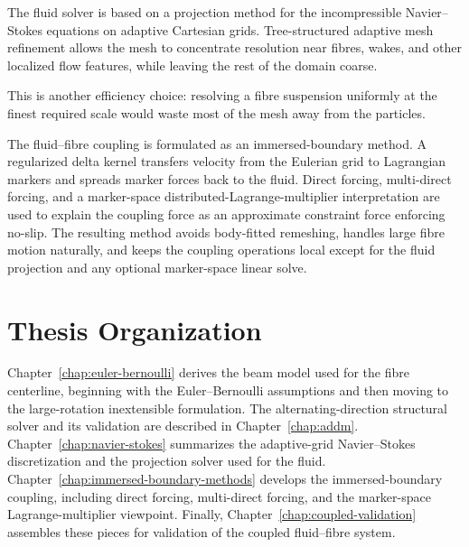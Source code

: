 The fluid solver is based on a projection method for the incompressible
Navier--Stokes equations on adaptive Cartesian grids. Tree-structured adaptive
mesh refinement allows the mesh to concentrate resolution near fibres, wakes,
and other localized flow features, while leaving the rest of the domain coarse.

This is another efficiency choice: resolving a fibre suspension uniformly at
the finest required scale would waste most of the mesh away from the particles.

The fluid--fibre coupling is formulated as an immersed-boundary method. A
regularized delta kernel transfers velocity from the Eulerian grid to
Lagrangian markers and spreads marker forces back to the fluid. Direct forcing,
multi-direct forcing, and a marker-space distributed-Lagrange-multiplier
interpretation are used to explain the coupling force as an approximate
constraint force enforcing no-slip. The resulting method avoids body-fitted
remeshing, handles large fibre motion naturally, and keeps the coupling
operations local except for the fluid projection and any optional marker-space
linear solve.

\section{Thesis Organization}

Chapter~\ref{chap:euler-bernoulli} derives the beam model used for the fibre
centerline, beginning with the Euler--Bernoulli assumptions and then moving to
the large-rotation inextensible formulation. The alternating-direction
structural solver and its validation are described in Chapter~\ref{chap:addm}.
Chapter~\ref{chap:navier-stokes} summarizes the adaptive-grid Navier--Stokes
discretization and the projection solver used for the fluid.
Chapter~\ref{chap:immersed-boundary-methods} develops the immersed-boundary
coupling, including direct forcing, multi-direct forcing, and the marker-space
Lagrange-multiplier viewpoint. Finally, Chapter~\ref{chap:coupled-validation}
assembles these pieces for validation of the coupled fluid--fibre system.
